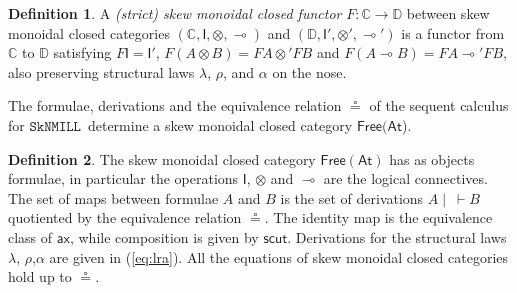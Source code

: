 \documentclass[copyright,creativecommons]{eptcs}
\theoremstyle{definition}
\newtheorem{defn}{Definition}[section]
\newcommand{\ax}{\mathsf{ax}}
\newcommand{\ot}{\otimes}
\newcommand{\lolli}{\multimap}
\newcommand{\I}{\mathsf{I}}
\newcommand{\SkNMILL}{$\mathtt{SkNMILL}$}
\newcommand{\FSkMCC}{\mathsf{Free}}
\begin{document}
\begin{defn}
  A \emph{(strict) skew monoidal closed functor} $F : \mathbb{C} \rightarrow \mathbb{D}$ between skew monoidal closed categories $(\mathbb{C} , \I , \ot , \lolli)$ and $(\mathbb{D} , \I' , \ot' , \lolli')$ is a functor from $\mathbb{C}$ to $\mathbb{D}$ satisfying
    $F \I = \I'$, $F (A \ot B) = F A \ot' F B$ and
    $F(A \lolli B) = F A \lolli' F B$, also preserving  structural laws $\lambda$, $\rho$, and $\alpha$ on the nose.
\end{defn}

The formulae, derivations and the equivalence relation $\circeq$ of the sequent calculus for \SkNMILL\ determine a skew monoidal closed category $\FSkMCC(\mathsf{At}$).
\begin{defn}\label{def:fskmcc}
  The skew monoidal closed category $\FSkMCC(\mathsf{At})$ has
  as objects formulae, in particular the operations $\I$, $\ot$ and $\lolli$ are the logical connectives. The set of maps between formulae $A$ and $B$ is the set of derivations $A \mid ~ \vdash B$ quotiented by the equivalence relation $\circeq$. The identity map is the equivalence class of $\ax$, while composition is given by $\mathsf{scut}$. Derivations for the structural laws $\lambda$, $\rho$,$\alpha$ are given in (\ref{eq:lra}). All the equations of skew monoidal closed categories hold up to $\circeq$.
\end{defn}
\end{document}
